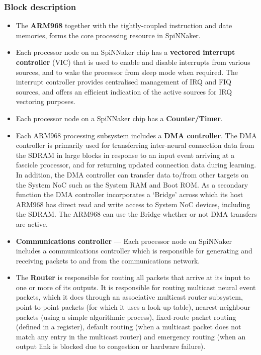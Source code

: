 \documentclass[a4paper, 11pt]{article}
\begin{document}
\subsubsection{Block description}
\begin{itemize}
	\setlength\itemsep{-2pt}
	\item The \textbf{ARM968} together with the tightly-coupled instruction and date memories, forms the core processing resource in SpiNNaker.
	\item Each processor node on an SpiNNaker chip has a \textbf{vectored interrupt controller} (VIC) that is used to enable  and disable  interrupts  from  various  sources,  and  to wake  the processor  from  sleep mode when required. The interrupt controller provides centralised management of IRQ and FIQ sources, and offers an efficient indication of the active sources for IRQ vectoring purposes.
	\item Each processor node on a SpiNNaker chip has a \textbf{Counter/Timer}.
	\item Each ARM968 processing subsystem includes a \textbf{DMA controller}. The DMA controller is primarily used for transferring inter-neural connection data from the SDRAM in large blocks in response to an  input  event  arriving  at a  fascicle processor, and  for  returning updated connection data during learning. In addition, the DMA controller can transfer data to/from other targets on the System NoC such as the System RAM and Boot ROM. As a secondary function the DMA controller incorporates a `Bridge' across which its host ARM968 has direct read and write access to System NoC devices, including the SDRAM. The ARM968 can use the Bridge whether or not DMA transfers are active.
	\item	\textbf{Communications controller} --- Each processor node on SpiNNaker includes a communications controller which is responsible for generating and receiving packets to and from the communications network.
	\item The \textbf{Router} is responsible for routing all packets that arrive at its input to one or more of its outputs. It  is  responsible  for  routing multicast neural event packets, which  it does  through an associative multicast  router  subsystem,  point-to-point  packets  (for  which  it  uses  a  look-up  table),  nearest-neighbour packets  (using  a  simple  algorithmic process),  fixed-route packet  routing  (defined  in  a register), default routing (when a multicast packet does not match any entry in the multicast router) and emergency routing (when an output link is blocked due to congestion or hardware failure).\\

\end{itemize}
\end{document}
